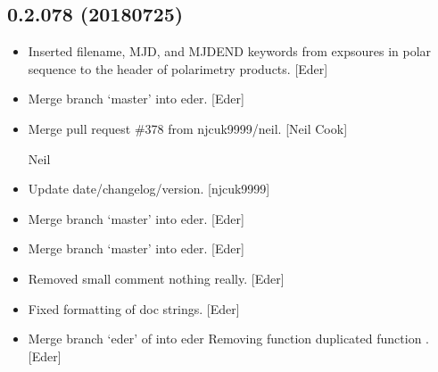 \documentclass[a4paper,10pt,english]{report}
\begin{document}
\subsection{0.2.078 (2018\sphinxhyphen{}07\sphinxhyphen{}25)}
\label{\detokenize{misc/changelog:id405}}\begin{itemize}
\item {} 
Inserted filename, MJD, and MJDEND keywords from expsoures in polar
sequence to the header of polarimetry products. {[}Eder{]}

\item {} 
Merge branch ‘master’ into eder. {[}Eder{]}

\item {} 
Merge pull request \#378 from njcuk9999/neil. {[}Neil Cook{]}

Neil

\item {} 
Update date/changelog/version. {[}njcuk9999{]}

\item {} 
Merge branch ‘master’ into eder. {[}Eder{]}

\item {} 
Merge branch ‘master’ into eder. {[}Eder{]}

\item {} 
Removed small comment \textendash{} nothing really. {[}Eder{]}

\item {} 
Fixed formatting of doc strings. {[}Eder{]}

\item {} 
Merge branch ‘eder’ of  into
eder Removing function duplicated function . {[}Eder{]}

\end{itemize}
\end{document}
